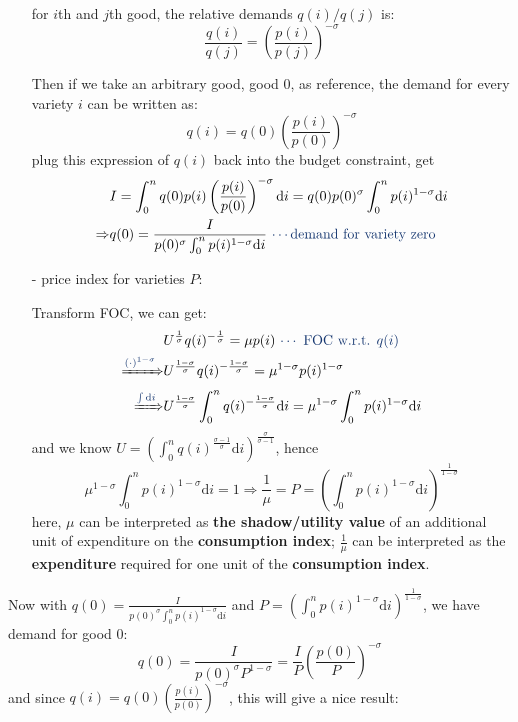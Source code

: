 \documentclass[10pt,landscape,a4paper]{article}
\begin{document}
\begin{multicols*}{4}
\begin{itemize}
    for $i$th and $j$th good, the relative demands $q(i)/q(j)$ is:
$$ \frac{q(i)}{q(j)} = \left( \frac{p(i)}{p(j)} \right)^{-\sigma} $$

    Then if we take an arbitrary good, good 0, as reference, the demand for every variety $i$ can be written as:
    $$
    q(i) = q(0)\left(\frac{p(i)}{p(0)} \right)^{-\sigma}
    $$
    plug this expression of $q(i)$ back into the budget constraint, get
    \begin{align*}
        & I=\int^n_0 q(0)p(i)\left(\frac{p(i)}{p(0)} \right)^{-\sigma} \mathrm{d}i 
    =q(0)p(0)^{\sigma} \int^n_0 p(i)^{1-\sigma}\mathrm{d}i\\
    \Rightarrow & q(0)=\frac{I}{p(0)^{\sigma} \int^n_0 p(i)^{1-\sigma}\mathrm{d}i}\ {\color{myblue}\cdots \text{demand for variety zero}}
    \end{align*}

    \item[-] price index for varieties $P$:
    
    Transform FOC, we can get:
    \begin{align*}
        &U^{\frac{1}{\sigma}}q(i)^{-\frac{1}{\sigma}}=\mu p(i)\ {\color{myblue}\cdots {\text{ FOC w.r.t. }q(i)}}\\
        \xRightarrow{{\color{myblue}(\cdot)^{1-\sigma}}}& U^{\frac{1-\sigma}{\sigma}}q(i)^{-\frac{1-\sigma}{\sigma}}=\mu ^{1-\sigma}p(i)^{1-\sigma}\\
        \xRightarrow{{\color{myblue}\int\mathrm{d}i}} & U^{\frac{1-\sigma}{\sigma}} \int^n_0 q(i)^{-\frac{1-\sigma}{\sigma}}\mathrm{d}i=\mu ^{1-\sigma} \int^n_0 p(i)^{1-\sigma}\mathrm{d}i
    \end{align*}
    and we know $U=\left(\int^n_0 q(i)^{\frac{\sigma-1}{\sigma}}\mathrm{d}i\right)^{\frac{\sigma}{\sigma-1}}$, hence
    $$
    \mu^{1-\sigma}\int^n_0 p(i)^{1-\sigma}\mathrm{d}i=1\Rightarrow \frac{1}{\mu}=P=\left( \int^n_0 p(i)^{1-\sigma}\mathrm{d}i \right)^{\frac{1}{1-\sigma}}
    $$
    here, $\mu$ can be interpreted as {\color{myblue}\textbf{the shadow/utility value}} of an additional unit of expenditure on the {\color{myblue}\textbf{consumption index}}; $\frac{1}{\mu}$ can be interpreted as the {\color{myblue}\textbf{expenditure}} required for one unit of the {\color{myblue}\textbf{consumption index}}.
\end{itemize}

Now with $q(0)=\frac{I}{p(0)^{\sigma} \int^n_0 p(i)^{1-\sigma}\mathrm{d}i}$ and $P=\left( \int^n_0 p(i)^{1-\sigma}\mathrm{d}i \right)^{\frac{1}{1-\sigma}}$, we have demand for good 0:
$$
q(0)=\frac{I}{p(0)^{\sigma}P^{1-\sigma}}=\frac{I}{P}\left( \frac{p(0)}{P} \right)^{-\sigma}
$$
and since $q(i) = q(0)\left(\frac{p(i)}{p(0)} \right)^{-\sigma}$, this will give a nice result:


\end{multicols*}
\end{document}
